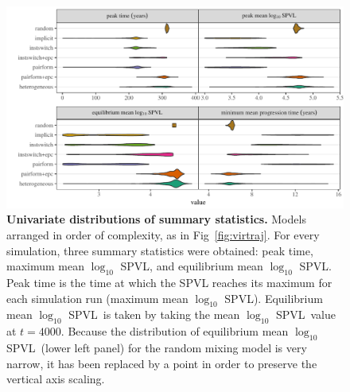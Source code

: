 \documentclass[10pt,letterpaper]{article}
\renewcommand{\figurename}{Fig}
\newcommand{\Lspvl}{$\log_{10}$ SPVL}
\begin{document}
\begin{figure}[!ht]
\includegraphics[width=\textwidth]{../figures/fig3.pdf}
\caption{{\bf Univariate distributions of summary statistics.}
Models arranged in order of complexity, as in \figurename~\ref{fig:virtraj}.
For every simulation, three summary statistics were obtained: peak time, maximum mean \Lspvl, and equilibrium mean \Lspvl. 
Peak time is the time at which the SPVL reaches its maximum for each simulation run (maximum mean \Lspvl).
Equilibrium mean \Lspvl\ is taken by taking the mean \Lspvl\ value at $t = 4000$.
Because the distribution of equilibrium mean \Lspvl\
(lower left panel) for the random mixing model is very narrow, it
has been replaced by a point in order to preserve the vertical axis scaling.}
\label{fig:unidist}
\end{figure}
\end{document}
